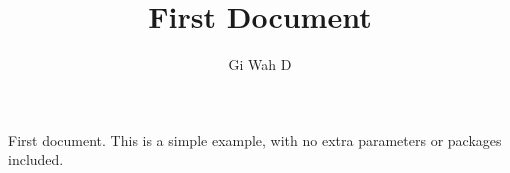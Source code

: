 \documentclass[12pt,a4paper]{article}
\title{First Document}
\author{Gi Wah D}
\begin{document}
\maketitle
First document. This is a simple example, with no 
extra parameters or packages included.
\end{document}
